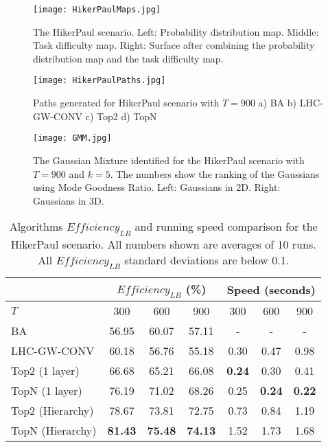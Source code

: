 \documentclass[journal]{IEEEtran}
\begin{document}
\begin{figure}[!ht]
\centering
\texttt{[image: HikerPaulMaps.jpg]}
\caption{The HikerPaul scenario. Left: Probability distribution map. Middle: Task difficulty map. Right: Surface after combining the probability distribution map and the task difficulty map.}
\label{HikerPaulMaps}
\end{figure}
\begin{figure}[!ht]
\centering
\texttt{[image: HikerPaulPaths.jpg]}
\caption{Paths generated for HikerPaul scenario with $T=900$ a) BA b) LHC-GW-CONV c) Top2 d) TopN}
\label{HikerPaulPaths}
\end{figure}
\begin{figure}[!ht]
\centering
\texttt{[image: GMM.jpg]}
\caption{The Gaussian Mixture identified for the HikerPaul scenario with $T=900$ and $k=5$. The numbers show the ranking of the Gaussians using Mode Goodness Ratio. Left: Gaussians in 2D. Right: Gaussians in 3D.}
\label{GMMRanking}
\end{figure}
\begin{table}[!ht]
\caption{Algorithms $\mathit{Efficiency_{LB}}$ and running speed comparison for the HikerPaul scenario. All numbers shown are averages of 10 runs. All $\mathit{Efficiency_{LB}}$ standard deviations are below 0.1.}
	\centering
		\begin{tabular}
			{|l|c|c|c|c|c|c|}
			\hline
			 & \multicolumn{3}{|c|}{$\mathit{Efficiency_{LB}}$ (\%)} & \multicolumn{3}{|c|}{Speed (seconds)} \\
			\hline
			$T$ & 300 & 600 & 900	& 300 & 600 & 900 \\
			\hline
			BA & 56.95 & 60.07 & 57.11 & - & - & - \\
			\hline			
			LHC-GW-CONV & 60.18 & 56.76 & 55.18 & 0.30 & 0.47 & 0.98 \\
			\hline			
			Top2 (1 layer)	& 66.68 & 65.21 & 66.08 & \textbf{0.24} & 0.30 & 0.41 \\ 
			\hline
			TopN (1 layer)	& 76.19 & 71.02 & 68.26 & 0.25 & \textbf{0.24} & \textbf{0.22} \\ 
			\hline
			Top2 (Hierarchy) & 78.67 & 73.81 & 72.75 & 0.73 & 0.84 & 1.19 \\ 
			\hline
			TopN (Hierarchy) & \textbf{81.43} & \textbf{75.48} & \textbf{74.13} & 1.52 & 1.73 & 1.68 \\ 
			\hline			
		\end{tabular}
\label{HikerPaul}
\end{table}
\end{document}
